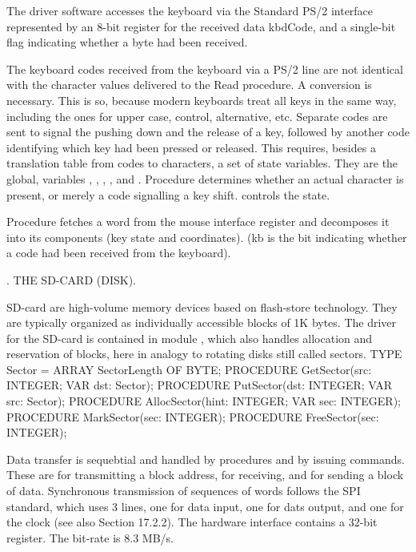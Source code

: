 \noindent The driver software accesses the keyboard via the Standard PS/2 interface represented by an 8-bit register for the received data kbdCode, and a single-bit flag indicating whether a byte had been received.

The keyboard codes received from the keyboard via a PS/2 line are not identical with the character values delivered to the Read procedure. A conversion is necessary. This is so, because modern keyboards treat all keys in the same way, including the ones for upper case, control, alternative, etc. Separate codes are sent to signal the pushing down and the release of a key, followed by another code identifying which key had been pressed or released. This requires, besides a translation table from codes to characters, a set of state variables. They are the global,  variables , , , , and . Procedure  determines whether an actual character is present, or merely a code signalling a key shift.  controls the state.

Procedure  fetches a word from the mouse interface register and decomposes it into its components (key state and coordinates). (kb is the bit indicating whether a code had been received from the keyboard).


. THE SD-CARD (DISK).

SD-card are high-volume memory devices based on flash-store technology. They are typically organized as individually accessible blocks of 1K bytes. The driver for the SD-card is contained in module , which also handles allocation and reservation of blocks, here in analogy to rotating disks still called sectors.
\begintt
TYPE Sector = ARRAY SectorLength OF BYTE;
PROCEDURE GetSector(src: INTEGER; VAR dst: Sector);
PROCEDURE PutSector(dst: INTEGER; VAR src: Sector);
PROCEDURE AllocSector(hint: INTEGER; VAR sec: INTEGER);
PROCEDURE MarkSector(sec: INTEGER);
PROCEDURE FreeSector(sec: INTEGER);
\endtt

\noindent Data transfer is sequebtial and handled by procedures  and  by issuing commands. These are for transmitting a block address, for receiving, and for sending a block of data. Synchronous transmission of sequences of words follows the SPI standard, which uses 3 lines, one for data input, one for dats output, and one for the clock (see also Section 17.2.2). The hardware interface contains a 32-bit register. The bit-rate is 8.3 MB/s.

